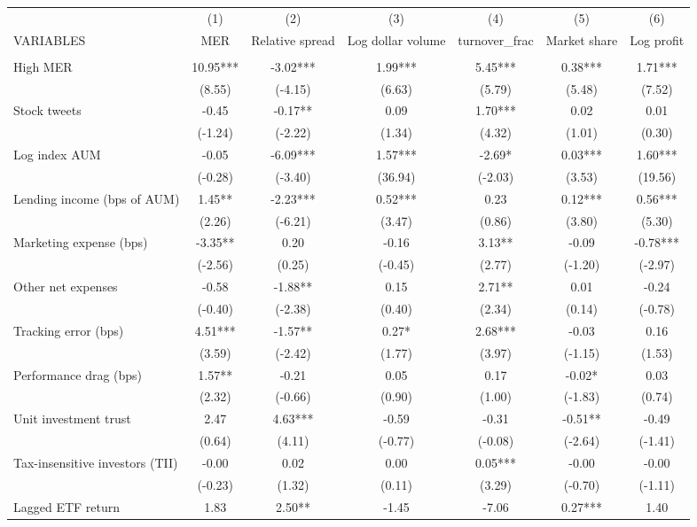 \documentclass[]{article}
\begin{document}
\begin{tabular}{lcccccc} \hline
 & (1) & (2) & (3) & (4) & (5) & (6) \\
VARIABLES & MER & Relative spread & Log dollar volume & turnover\_frac & Market share & Log profit \\ \hline
 &  &  &  &  &  &  \\
High MER & 10.95*** & -3.02*** & 1.99*** & 5.45*** & 0.38*** & 1.71*** \\
 & (8.55) & (-4.15) & (6.63) & (5.79) & (5.48) & (7.52) \\
Stock tweets & -0.45 & -0.17** & 0.09 & 1.70*** & 0.02 & 0.01 \\
 & (-1.24) & (-2.22) & (1.34) & (4.32) & (1.01) & (0.30) \\
Log index AUM & -0.05 & -6.09*** & 1.57*** & -2.69* & 0.03*** & 1.60*** \\
 & (-0.28) & (-3.40) & (36.94) & (-2.03) & (3.53) & (19.56) \\
Lending income (bps of AUM) & 1.45** & -2.23*** & 0.52*** & 0.23 & 0.12*** & 0.56*** \\
 & (2.26) & (-6.21) & (3.47) & (0.86) & (3.80) & (5.30) \\
Marketing expense (bps) & -3.35** & 0.20 & -0.16 & 3.13** & -0.09 & -0.78*** \\
 & (-2.56) & (0.25) & (-0.45) & (2.77) & (-1.20) & (-2.97) \\
Other net expenses & -0.58 & -1.88** & 0.15 & 2.71** & 0.01 & -0.24 \\
 & (-0.40) & (-2.38) & (0.40) & (2.34) & (0.14) & (-0.78) \\
Tracking error (bps) & 4.51*** & -1.57** & 0.27* & 2.68*** & -0.03 & 0.16 \\
 & (3.59) & (-2.42) & (1.77) & (3.97) & (-1.15) & (1.53) \\
Performance drag (bps) & 1.57** & -0.21 & 0.05 & 0.17 & -0.02* & 0.03 \\
 & (2.32) & (-0.66) & (0.90) & (1.00) & (-1.83) & (0.74) \\
Unit investment trust & 2.47 & 4.63*** & -0.59 & -0.31 & -0.51** & -0.49 \\
 & (0.64) & (4.11) & (-0.77) & (-0.08) & (-2.64) & (-1.41) \\
Tax-insensitive investors (TII) & -0.00 & 0.02 & 0.00 & 0.05*** & -0.00 & -0.00 \\
 & (-0.23) & (1.32) & (0.11) & (3.29) & (-0.70) & (-1.11) \\
Lagged ETF return & 1.83 & 2.50** & -1.45 & -7.06 & 0.27*** & 1.40 \\

\end{tabular}
\end{document}
